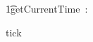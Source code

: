 
\begin{circus}
  \t1\circchannel getCurrentTime~:~\nat\\
  \begin{block}\circchannel tick\end{block}
\end{circus}
